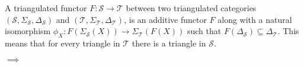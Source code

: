     \begin{definition}
        A triangulated functor $F: \mathcal{S} \rightarrow \mathcal{T}$ between two triangulated categories $(\mathcal{S}, \Sigma_{\mathcal{S}}, \Delta_\mathcal{S})$ and $(\mathcal{T}, \Sigma_{\mathcal{T}}, \Delta_\mathcal{T})$, is an additive functor $F$ along with a natural isomorphism $\phi_X : F(\Sigma_{\mathcal{S}}(X)) \rightarrow \Sigma_{\mathcal{T}}(F(X))$ such that $F(\Delta_{\mathcal{S}}) \subseteq \Delta_{\mathcal{T}}$. This means that for every triangle in $\mathcal{T}$ there is a triangle in $\mathcal{S}$.
        \begin{center}
            $\implies$
        \end{center}
    \end{definition}

